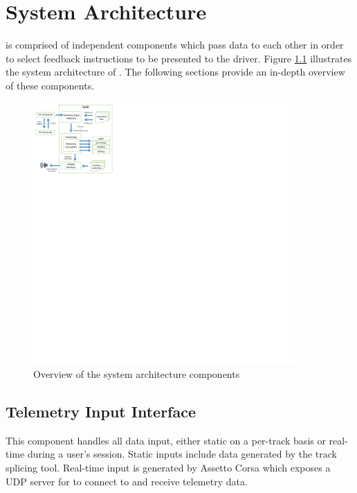 \section{System Architecture}
\label{sec:imp-systemArchitecture}
\methodname is comprised of independent components which pass data to each other in order to select feedback instructions to be presented to the driver. Figure \ref{} illustrates the system architecture of \methodname. The following sections provide an in-depth overview of these components.

\begin{figure}[!htb]
	\centering
	\includegraphics[height=10cm]{diagrams/SystemArch}
	\caption{Overview of the system architecture components}
	\label{fig:SystemArch}
\end{figure}

\subsection{Telemetry Input Interface}
This component handles all data input, either static on a per-track basis or real-time during a user's session. Static inputs include data generated by the track splicing tool. Real-time input is generated by Assetto Corsa which exposes a UDP server for \methodname to connect to and receive telemetry data.

